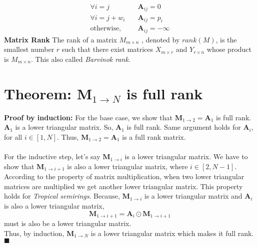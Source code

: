 \begin{align*}
\forall i=j \quad &\mathbf{A}_{ij} = 0 \\
\forall i=j+w_i \quad &\mathbf{A}_{ij} = p_{i} \\
\text{otherwise,} \quad  &\mathbf{A}_{ij} = -\infty 
\end{align*}
\textbf{Matrix Rank} The rank of a matrix $M_{m\times n}$ , denoted by $rank(M)$, is the smallest number $r$ such that there exist
matrices $X_{m\times r}$ and $Y_{r\times n}$ whose product is $M_{m\times n}$. This also called \textit{Barvinok rank}.


\section{Theorem: $\mathbf{M}_{1 \rightarrow {N}}$ is full rank}
\textbf{Proof by induction: } For the base case, we show that $\mathbf{M}_{1 \rightarrow 2 } = \mathbf{A}_1$ is full rank.\\
$\mathbf{A}_1$ is a lower triangular matrix. So, $\mathbf{A}_1$ is full rank. Same argument holds for $\mathbf{A}_i$, for all $i \in [1,N]$. Thus, $\mathbf{M}_{1 \rightarrow 2 } = \mathbf{A}_1$ is a full rank matrix.
\\
\\
\noindent
For the inductive step, let's say $\mathbf{M}_{1 \rightarrow i }$ is a lower triangular matrix. We have to show that $\mathbf{M}_{1 \rightarrow i+1 }$ is also a lower triangular matrix, where $ i \in [2, N-1]$. 
\\ 
According to the property of matrix multiplication, when two lower triangular matrices are multiplied we get another lower triangular matrix. This property holds for \textit{Tropical semirings}. Because, $\mathbf{M}_{1 \rightarrow i }$ is a lower triangular matrix and $\mathbf{A}_{i}$ is also a lower triangular matrix,
\[
\mathbf{M}_{1 \rightarrow {i+1}} =  \mathbf{A}_{i}\odot \mathbf{M}_{1 \rightarrow {i+1}}
\]
must is also be a lower triangular matrix. \\
Thus, by induction, $\mathbf{M}_{1 \rightarrow {N}}$ is a lower triangular matrix which makes it full rank. $\blacksquare$ \\
\\


